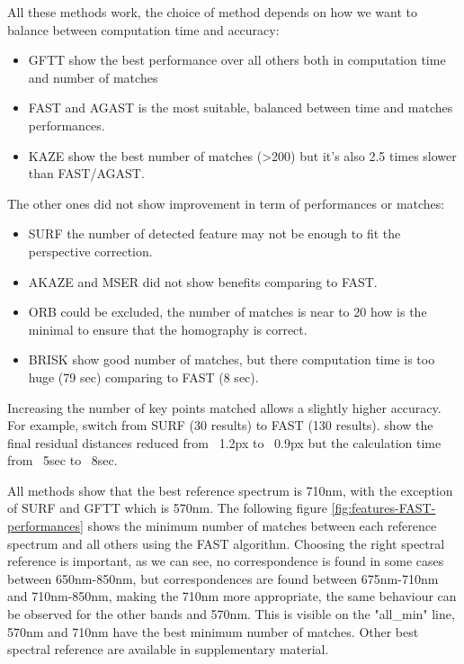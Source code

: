 \documentclass[]{elsarticle}
\begin{document}
	\noindent
	All these methods work, the choice of method depends on how we want to balance between computation time and accuracy:
	\begin{itemize}
		\item GFTT show the best performance over all others both in computation time and number of matches
		\item FAST and AGAST is the most suitable, balanced between time and matches performances.
		\item KAZE show the best number of matches (>200) but it's also 2.5 times slower than FAST/AGAST.
	\end{itemize}
	
	\noindent
	The other ones did not show improvement in term of performances or matches:
	\begin{itemize}
		\item SURF the number of detected feature may not be enough to fit the perspective correction.
		\item AKAZE and MSER did not show benefits comparing to FAST.
		\item ORB could be excluded, the number of matches is near to 20 how is the minimal to ensure that the homography is correct.
		\item BRISK show good number of matches, but there computation time is too huge (79 sec) comparing to FAST (8 sec).
	\end{itemize}
	
	Increasing the number of key points matched allows a slightly higher accuracy. For example, switch from SURF (30 results) to FAST (130 results). show the final residual distances reduced from ~1.2px to ~0.9px but the calculation time from ~5sec to ~8sec.

	All methods show that the best reference spectrum is 710nm, with the exception of SURF and GFTT which is 570nm.
	The following figure \ref{fig:features-FAST-performances} shows the minimum number of matches between each reference spectrum and all others using the FAST algorithm.
	Choosing the right spectral reference is important, as we can see, no correspondence is found in some cases between 650nm-850nm,
	but correspondences are found between 675nm-710nm and 710nm-850nm, making the 710nm more appropriate,
	the same behaviour can be observed for the other bands and 570nm.
	This is visible on the "all\_min" line, 570nm and 710nm have the best minimum number of matches.
	Other best spectral reference are available in supplementary material.
	
\end{document}

